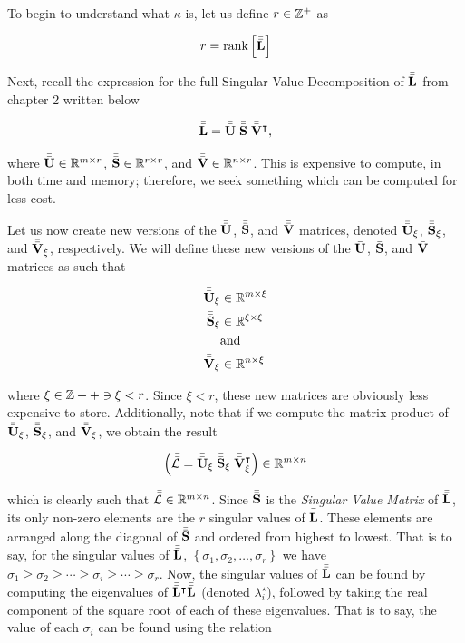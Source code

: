 \documentclass[../../ClusteringConnectionsMAIN.tex]{subfiles}
\begin{document}
\begin{flushleft}
\begin{large}


To begin to understand what $\kappa$ is, let us define $r \in \mathbb{Z}^+$ as 

\begin{align*}
r = \text{rank} \left[ \bar{\bar{\mathbf{L}}} \right]
\end{align*}

Next, recall the expression for the full Singular Value Decomposition of $\bar{\bar{\mathbf{L}}}$ from chapter 2 written below

\begin{align}
\bar{\bar{\mathbf{L}}} = \bar{\bar{\mathbf{U}}} \; \bar{\bar{\mathbf{S}}} \; \bar{\bar{\mathbf{V}}}^\intercal,  \notag
\end{align}

where $\bar{\bar{\mathbf{U}}} \in \mathbb{R}^{m \times r}$, $\bar{\bar{\mathbf{S}}} \in \mathbb{R}^{r \times r}$, and $\bar{\bar{\mathbf{V}}} \in \mathbb{R}^{n \times r}$.  This is expensive to compute, in both time and memory; therefore, we seek something which can be computed for less cost.  \newline

Let us now create new versions of the $\bar{\bar{\mathbf{U}}}$, $\bar{\bar{\mathbf{S}}}$, and $\bar{\bar{\mathbf{V}}}$ matrices, denoted $\bar{\bar{\mathbf{U}}}_\xi$, $\bar{\bar{\mathbf{S}}}_\xi$, and $\bar{\bar{\mathbf{V}}}_\xi$, respectively.  We will define these new versions of the $\bar{\bar{\mathbf{U}}}$, $\bar{\bar{\mathbf{S}}}$, and $\bar{\bar{\mathbf{V}}}$ matrices as such that

\begin{align*}
\bar{\bar{\mathbf{U}}}_\xi &\in \mathbb{R}^{m \times \xi} \\
\bar{\bar{\mathbf{S}}}_\xi &\in \mathbb{R}^{\xi \times \xi} \\
 & \textrm{and} \\
\bar{\bar{\mathbf{V}}}_\xi &\in \mathbb{R}^{n \times \xi}
\end{align*}

where $\xi \in \mathbb{Z}++ \ni \xi < r$.  Since $\xi < r$, these new matrices are obviously less expensive to store. Additionally, note that if we compute the matrix product of $\bar{\bar{\mathbf{U}}}_\xi$, $\bar{\bar{\mathbf{S}}}_\xi$, and $\bar{\bar{\mathbf{V}}}_\xi$, we obtain the result

\begin{align}
\left( \bar{\bar{\mathbf{\mathcal{L}}}} = \bar{\bar{\mathbf{U}}}_\xi \; \bar{\bar{\mathbf{S}}}_\xi \; \bar{\bar{\mathbf{V}}}_\xi^\intercal \right) \in \mathbb{R}^{m \times n}
\end{align}

which is clearly such that $\bar{\bar{\mathbf{\mathcal{L}}}} \in \mathbb{R}^{m \times n}$.  Since $\bar{\bar{\mathbf{S}}}$ is the \emph{Singular Value Matrix} of $\bar{\bar{\mathbf{L}}}$, its only non-zero elements are the $r$ singular values of $\bar{\bar{\mathbf{L}}}$.  These elements are arranged along the diagonal of $\bar{\bar{\mathbf{S}}}$ and ordered from highest to lowest.  That is to say, for the singular values of $\bar{\bar{\mathbf{L}}}$, $\left\{ \sigma_1, \sigma_2, \dots, \sigma_r \right\}$ we have $\sigma_1 \geq \sigma_2 \geq \cdots \geq \sigma_i \geq \cdots \geq \sigma_r$.  Now, the singular values of $\bar{\bar{\mathbf{L}}}$ can be found by computing the eigenvalues of $\bar{\bar{\mathbf{L}}}^\intercal \bar{\bar{\mathbf{L}}}$ (denoted $\lambda^\star_i$), followed by taking the real component of the square root of each of these eigenvalues.  That is to say, the value of each $\sigma_i$ can be found using the relation


\end{large}
\end{flushleft}
\end{document}
